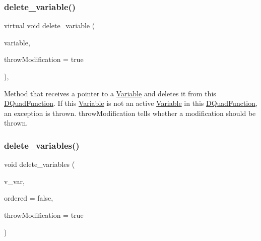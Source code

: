 \subsubsection{\texorpdfstring{delete\+\_\+variable()}{delete\_variable()}}
{\footnotesize\ttfamily virtual void delete\+\_\+variable (\begin{DoxyParamCaption}\item[{\mbox{\hyperlink{class_s_m_spp__di__unipi__it_1_1_variable}{Variable}} $\ast$}]{variable,  }\item[{const bool}]{throw\+Modification = {\ttfamily true} }\end{DoxyParamCaption})\hspace{0.3cm}{\ttfamily [override]}, {\ttfamily [virtual]}}

Method that receives a pointer to a \mbox{\hyperlink{class_s_m_spp__di__unipi__it_1_1_variable}{Variable}} and deletes it from this \mbox{\hyperlink{class_s_m_spp__di__unipi__it_1_1_d_quad_function}{D\+Quad\+Function}}. If this \mbox{\hyperlink{class_s_m_spp__di__unipi__it_1_1_variable}{Variable}} is not an active \mbox{\hyperlink{class_s_m_spp__di__unipi__it_1_1_variable}{Variable}} in this \mbox{\hyperlink{class_s_m_spp__di__unipi__it_1_1_d_quad_function}{D\+Quad\+Function}}, an exception is thrown. throw\+Modification tells whether a modification should be thrown. \mbox{\label{class_s_m_spp__di__unipi__it_1_1_d_quad_function_af3b44e4a29223544fb46e2bed7700fed}} 
\subsubsection{\texorpdfstring{delete\+\_\+variables()}{delete\_variables()}}
{\footnotesize\ttfamily void delete\+\_\+variables (\begin{DoxyParamCaption}\item[{std\+::vector$<$ \mbox{\hyperlink{class_s_m_spp__di__unipi__it_1_1_variable}{Variable}} $\ast$$>$ $\ast$}]{v\+\_\+var,  }\item[{const bool}]{ordered = {\ttfamily false},  }\item[{const bool}]{throw\+Modification = {\ttfamily true} }\end{DoxyParamCaption})\hspace{0.3cm}{\ttfamily [override]}}

